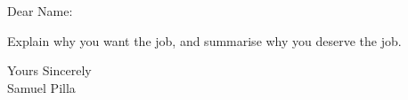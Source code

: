 \documentclass[a4paper,english]{friggeri-letter}
\begin{document}

\address{ 
   4055 Laclede Avenue \\
   St. Louis, MO 63108
}




   
  

\opening{Dear Name:} 

Explain why you want the job, and summarise why you deserve the job.


\closing{
   Yours Sincerely\\
   Samuel Pilla} 
\end{document}
